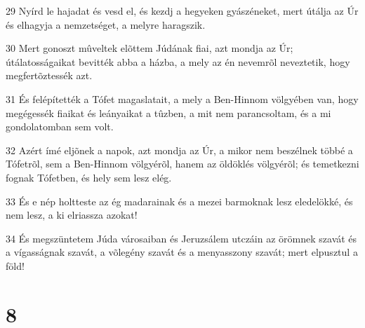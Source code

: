 \par 29 Nyírd le hajadat és vesd el, és kezdj a hegyeken gyászéneket, mert útálja az Úr és elhagyja a nemzetséget, a melyre haragszik.
\par 30 Mert gonoszt mûveltek elõttem Júdának fiai, azt mondja az Úr; útálatosságaikat bevitték abba a házba, a mely az én nevemrõl neveztetik, hogy megfertõztessék azt.
\par 31 És felépítették a Tófet magaslatait, a mely a Ben-Hinnom völgyében van, hogy megégessék fiaikat és leányaikat a tûzben, a mit nem parancsoltam, és a mi gondolatomban sem volt.
\par 32 Azért ímé eljõnek a napok, azt mondja az Úr, a mikor nem beszélnek többé a Tófetrõl, sem a Ben-Hinnom völgyérõl, hanem az öldöklés völgyérõl; és temetkezni fognak Tófetben, és hely sem lesz elég.
\par 33 És e nép holtteste az ég madarainak és a mezei barmoknak lesz eledelökké, és nem lesz, a ki elriassza azokat!
\par 34 És megszüntetem Júda városaiban és Jeruzsálem utczáin az örömnek szavát és a vígasságnak szavát, a võlegény szavát és a menyasszony szavát; mert elpusztul a föld!

\chapter{8}

